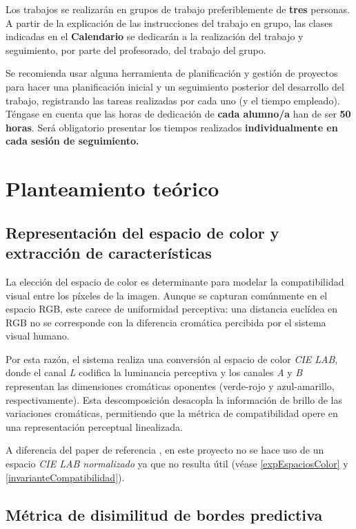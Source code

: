 \documentclass[a4paper]{article}
\theoremstyle{plain} %
\theoremstyle{plain} %
\begin{document}
Los trabajos se realizarán en grupos de trabajo preferiblemente de {\bf tres} personas.  A partir de la explicación de las instrucciones del trabajo en grupo, las clases indicadas en el {\bf Calendario} se dedicarán a la realización del trabajo y seguimiento, por parte del profesorado, del trabajo del grupo. 

Se recomienda usar alguna herramienta de planificación y gestión de proyectos para hacer una planificación inicial y un seguimiento posterior del desarrollo del trabajo, registrando las tareas realizadas por cada uno (y el tiempo empleado). Téngase en cuenta que las horas de dedicación de \textbf{cada alumno/a} han de ser \textbf{50 horas}. Será obligatorio presentar los tiempos realizados {\bf individualmente en cada sesión de seguimiento.}

\section{Planteamiento teórico}

\subsection{Representación del espacio de color y extracción de características}
\label{representaciondelespaciodecoloryextracciondecaracteristicas}

La elección del espacio de color es determinante para modelar la compatibilidad visual entre los píxeles de la imagen. 
Aunque se capturan comúnmente en el espacio RGB, este carece de uniformidad perceptiva: una distancia euclídea en RGB no se corresponde
con la diferencia cromática percibida por el sistema visual humano.

Por esta razón, el sistema realiza una conversión al espacio de color \textit{CIE LAB}, donde el canal \textit{L} codifica la luminancia perceptiva 
y los canales \textit{A} y \textit{B} representan las dimensiones cromáticas oponentes (verde-rojo y azul-amarillo, respectivamente). Esta descomposición
desacopla la información de brillo de las variaciones cromáticas, permitiendo que la métrica de compatibilidad opere en una representación perceptual linealizada.

A diferencia del paper de referencia \cite{articulopomeranz}, en este proyecto no se hace uso de un espacio \textit{CIE LAB normalizado} ya que 
no resulta útil (véase \ref{expEspaciosColor} y \ref{invarianteCompatibilidad}).


\subsection{Métrica de disimilitud de bordes predictiva}
\end{document}
